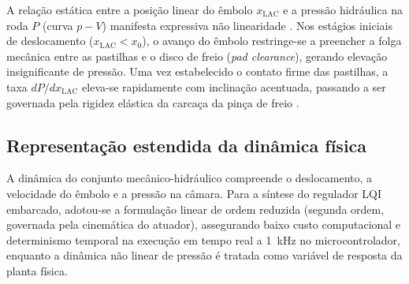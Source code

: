 A relação estática entre a posição linear do êmbolo $x_{\mathrm{LAC}}$ e a pressão hidráulica na roda $P$ (curva $p-V$) manifesta expressiva não linearidade \cite{breuer2008brake, xiong2021piston}. Nos estágios iniciais de deslocamento ($x_{\mathrm{LAC}} < x_0$), o avanço do êmbolo restringe-se a preencher a folga mecânica entre as pastilhas e o disco de freio (\textit{pad clearance}), gerando elevação insignificante de pressão. Uma vez estabelecido o contato firme das pastilhas, a taxa $dP/dx_{\mathrm{LAC}}$ eleva-se rapidamente com inclinação acentuada, passando a ser governada pela rigidez elástica da carcaça da pinça de freio \cite{breuer2008brake}.

\subsection[Representação estendida da dinâmica física]{Representação estendida da dinâmica física}
\label{sec:espaco-estados-lac}

A dinâmica do conjunto mecânico-hidráulico compreende o deslocamento, a velocidade do êmbolo e a pressão na câmara. Para a síntese do regulador LQI embarcado, adotou-se a formulação linear de ordem reduzida (segunda ordem, governada pela cinemática do atuador), assegurando baixo custo computacional e determinismo temporal na execução em tempo real a 1~kHz no microcontrolador, enquanto a dinâmica não linear de pressão é tratada como variável de resposta da planta física.

